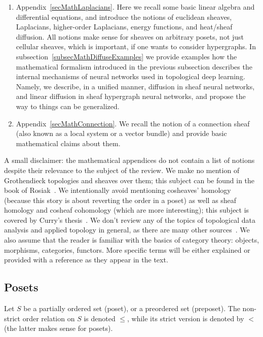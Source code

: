 \begin{enumerate}
  \item Appendix~\ref{secMathLaplacians}. Here we recall some basic linear algebra and differential equations, and introduce the notions of euclidean sheaves, Laplacians, higher-order Laplacians, energy functions, and heat/sheaf diffusion. All notions make sense for sheaves on arbitrary posets, not just cellular sheaves, which is important, if one wants to consider hypergraphs. In subsection~\ref{subsecMathDiffuseExamples} we provide examples how the mathematical formalism introduced in the previous subsection describes the internal mechanisms of neural networks used in topological deep learning. Namely, we describe, in a unified manner, diffusion in sheaf neural networks, and linear diffusion in sheaf hypergraph neural networks, and propose the way to things can be generalized.
  \item Appendix~\ref{secMathConnection}. We recall the notion of a connection sheaf (also known as a local system or a vector bundle) and provide basic mathematical claims about them.
\end{enumerate}

\begin{rem}
A small disclaimer: the mathematical appendices do not contain a list of notions despite their relevance to the subject of the review. We make no mention of Grothendieck topologies and sheaves over them; this subject can be found in the book of Rosiak~\cite{Rosiak}. We intentionally avoid mentioning cosheaves' homology (because this story is about reverting the order in a poset) as well as sheaf homology and cosheaf cohomology (which are more interesting); this subject is covered by Curry's thesis~\cite{Curry}. We don't review any of the topics of topological data analysis and applied topology in general, as there are many other sources~\cite{Zom,EdelHarer,Oudot,CarlssonVejdemo,DeyWang}. We also assume that the reader is familiar with the basics of category theory: objects, morphisms, categories, functors. More specific terms will be either explained or provided with a reference as they appear in the text. 
\end{rem}

\subsection{Posets}

Let $S$ be a partially ordered set (poset), or a preordered set (preposet). The non-strict order relation on $S$ is denoted $\leq$, while its strict version is denoted by $<$ (the latter makes sense for posets). 

